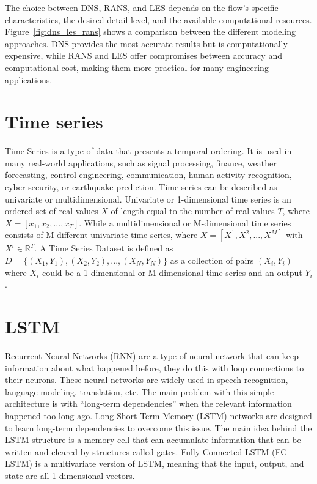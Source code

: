 The choice between DNS, RANS, and LES depends on the flow's specific characteristics, the desired detail level, and the available computational resources. Figure~\ref{fig:dns_les_rans} shows a comparison between the different modeling approaches. DNS provides the most accurate results but is computationally expensive, while RANS and LES offer compromises between accuracy and computational cost, making them more practical for many engineering applications.

\section{Time series}
\label{sec:TimeSeries} 

Time Series is a type of data that presents a temporal ordering. It is used in many real-world applications, such as signal processing, finance, weather forecasting, control engineering, communication, human activity recognition, cyber-security, or earthquake prediction. Time series can be described as univariate or multidimensional. Univariate or 1-dimensional time series is an ordered set of real values $X$ of length equal to the number of real values $T$, where $X = [x_1, x_2, ..., x_T]$. While a multidimensional or M-dimensional time series consists of M different univariate time series, where $X = [X^1, X^2, ..., X^M]$ with $X^i \in \mathbb{R}^T$. A Time Series Dataset is defined as $D = \{(X_1, Y_1), (X_2, Y_2), ..., (X_N, Y_N)\}$ as a collection of pairs $(X_i, Y_i)$ where $X_i$ could be a 1-dimensional or M-dimensional time series and an output $Y_i$.

\section{LSTM}
\label{sec:LSTM} 

Recurrent Neural Networks (RNN) are a type of neural network that can keep information about what happened before, they do this with loop connections to their neurons. These neural networks are widely used in speech recognition, language modeling, translation, etc. The main problem with this simple architecture is with “long-term dependencies” when the relevant information happened too long ago. Long Short Term Memory (LSTM) networks are designed to learn long-term dependencies to overcome this issue. The main idea behind the LSTM structure is a memory cell that can accumulate information that can be written and cleared by structures called gates. Fully Connected LSTM (FC-LSTM) is a multivariate version of LSTM, meaning that the input, output, and state are all 1-dimensional vectors.

